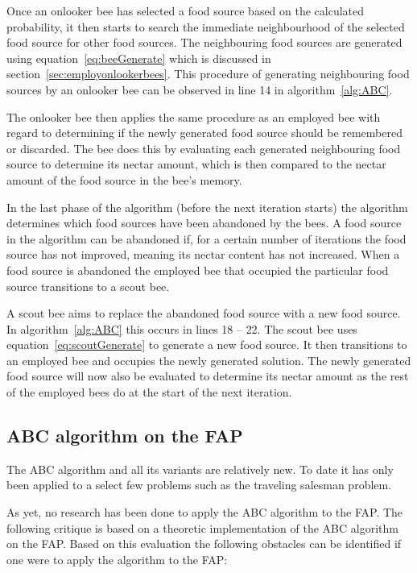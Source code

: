 Once an onlooker bee has selected a food source based on the calculated probability, it then starts to search the immediate neighbourhood of the selected food source for other food sources. The neighbouring food sources are generated using equation~\ref{eq:beeGenerate} which is discussed in section~\ref{sec:employonlookerbees}. This procedure of generating neighbouring food sources by an onlooker bee can be observed in line 14 in algorithm~\ref{alg:ABC}.

The onlooker bee then applies the same procedure as an employed bee with regard to determining if the newly generated food source should be remembered or discarded. The bee does this by evaluating each generated neighbouring food source to determine its nectar amount, which is then compared to the nectar amount of the food source in the bee's memory.

In the last phase of the algorithm (before the next iteration starts) the algorithm determines which food sources have been abandoned by the bees. A food source in the algorithm can be abandoned if, for a certain number of iterations the food source has not improved, meaning its nectar content has not increased. When a food source is abandoned the employed bee that occupied the particular food source transitions to a scout bee.

A scout bee aims to replace the abandoned food source with a new food source. In algorithm~\ref{alg:ABC} this occurs in lines 18 -- 22. The scout bee uses equation~\ref{eq:scoutGenerate} to generate a new food source. It then transitions to an employed bee and occupies the newly generated solution. The newly generated food source will now also be evaluated to determine its nectar amount as the rest of the employed bees do at the start of the next iteration.


\subsection{ABC algorithm on the FAP}
The ABC algorithm and all its variants are relatively new. To date it has only been applied to a select few problems such as the traveling salesman problem.

As yet, no research has been done to apply the ABC algorithm to the FAP. The following critique is based on a theoretic implementation of the ABC algorithm on the FAP. Based on this evaluation the following obstacles can be identified if one were to apply the algorithm to the FAP:
